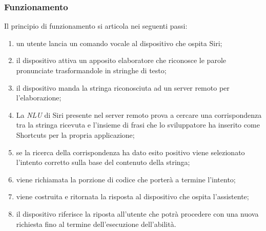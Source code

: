 		\subsubsection{Funzionamento}
		Il principio di funzionamento si articola nei seguenti passi:
		\begin{enumerate}
			\item un utente lancia un comando vocale al dispositivo che ospita Siri;
			\item il dispositivo attiva un apposito elaboratore che riconosce le parole pronunciate trasformandole in stringhe di testo;
			\item il dispositivo manda la stringa riconosciuta ad un server remoto per l'elaborazione;
			\item La \textit{NLU} di Siri presente nel server remoto prova a cercare una corrispondenza tra la stringa ricevuta e l'insieme di frasi che lo sviluppatore ha inserito come Shortcuts per la propria applicazione;
			\item se la ricerca della corrispondenza ha dato esito positivo viene selezionato l'intento corretto sulla base del contenuto della stringa;
			\item viene richiamata la porzione di codice che porterà a termine l'intento;
			\item viene costruita e ritornata la risposta al dispositivo che ospita l'assistente;
			\item il dispositivo riferisce la riposta all'utente che potrà procedere con una nuova richiesta fino al termine dell'esecuzione dell'abilità.
		\end{enumerate}
